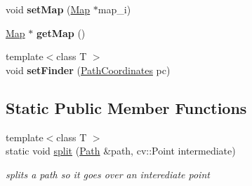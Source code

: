 \begin{DoxyCompactItemize}
void {\bfseries set\+Map} (\mbox{\hyperlink{class_map}{Map}} $\ast$map\+\_\+i)
\item 
\mbox{\label{class_path2_d_1_1_path_afb07c5b028be626ffe3b6dd2e4a51959}} 
\mbox{\hyperlink{class_map}{Map}} $\ast$ {\bfseries get\+Map} ()
\item 
\mbox{\label{class_path2_d_1_1_path_a7c07e2a15c8f7b912de69a5355174f23}} 
{\footnotesize template$<$class T $>$ }\\void {\bfseries set\+Finder} (\mbox{\hyperlink{class_path2_d_1_1_element_1_1_path_coordinates}{Path\+Coordinates}} pc)
\end{DoxyCompactItemize}
\subsection*{Static Public Member Functions}
\begin{DoxyCompactItemize}
\item 
\mbox{\label{class_path2_d_1_1_path_a7b0e3d48bc19de3e546e322d80437a52}} 
{\footnotesize template$<$class T $>$ }\\static void \mbox{\hyperlink{class_path2_d_1_1_path_a7b0e3d48bc19de3e546e322d80437a52}{split}} (\mbox{\hyperlink{class_path2_d_1_1_path}{Path}} \&path, cv\+::\+Point intermediate)
\begin{DoxyCompactList}\small\item\em splits a path so it goes over an interediate point \end{DoxyCompactList}\end{DoxyCompactItemize}

